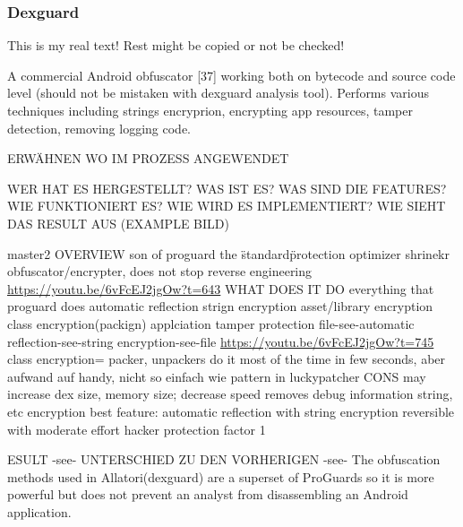 \subsubsection{Dexguard} \label{subsubsection:counter-reengineering-optobf-dexguard}
This is my real text! Rest might be copied or not be checked!


%
A commercial Android obfuscator [37] working both on bytecode and source code level (should not be mistaken with dexguard analysis tool). Performs various techniques including strings encryprion, encrypting app resources, tamper detection, removing logging code.
\cite{kovachevaMaster}
%


ERWÄHNEN WO IM PROZESS ANGEWENDET\newline


WER HAT ES HERGESTELLT? WAS IST ES? WAS SIND DIE FEATURES? WIE FUNKTIONIERT ES? WIE WIRD ES IMPLEMENTIERT? WIE SIEHT DAS RESULT AUS (EXAMPLE BILD)\newline

master2\newline
OVERVIEW\newline
son of proguard\newline
the \"standard\" protection\newline
optimizer\newline
shrinekr\newline
obfuscator/encrypter, does not stop reverse engineering\newline
\url{https://youtu.be/6vFcEJ2jgOw?t=643}\newline
WHAT DOES IT DO\newline
everything that proguard does\newline
automatic reflection\newline
strign encryption\newline
asset/library encryption\newline
class encryption(packign)\newline
applciation tamper protection\newline
file-see-automatic reflection-see-string encryption-see-file\newline
\url{https://youtu.be/6vFcEJ2jgOw?t=745}\newline
class encryption= packer, unpackers do it most of the time in few seconds, aber aufwand auf handy, nicht so einfach wie pattern in luckypatcher\newline
CONS\newline
may increase dex size, memory size; decrease speed\newline
removes debug information\newline
string, etc encryption\newline
best feature: automatic reflection with string encryption\newline
reversible with moderate effort\newline
hacker protection factor 1\newline

ESULT -see- UNTERSCHIED ZU DEN VORHERIGEN -see- The obfuscation methods used in Allatori(dexguard) are a superset of ProGuards so it is more powerful but does not prevent an analyst from disassembling an Android application.
